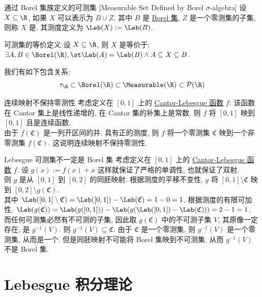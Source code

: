 \begin{dfn}
    {通过 Borel 集族定义的可测集}
    [Measurable Set Defined by Borel \(\sigma\)-algebra]
    设 \(X\subseteq\R\), 如果 \(X\) 可以表示为 \(B\cup Z\), 其中 \(B\) 是 \hyperref[xmp:borel]{Borel 集}, \(Z\) 是一个零测集的子集, 则称 \(X\) 是\MeasurableSet{}. 其测度定义为 \(\Leb(X) := \Leb(B)\).
\end{dfn}
\begin{ppt}
    {可测集的等价定义}
    设 \(X\subseteq\R\), 则 \(X\) 是\MeasurableSet{}等价于: \(\exists A,B\in\Borel(\R), \st \Leb(A)=\Leb(B) \land A\subseteq X\subseteq B\).
\end{ppt}
\begin{rmk}
    我们有如下包含关系:
    \[\tau_{\R}\subset\Borel(\R)\subset\Measurable(\R)\subset\mathcal{P}(\R)\]
\end{rmk}
\begin{cxmp}
    {连续映射不保持零测性}
    考虑定义在 \([0,1]\) 上的 \hyperref[dfn:cantor-lebesgue-function]{Cantor-Lebesgue 函数} \(f\): 该函数在 Cantor 集上是线性递增的, 在 Cantor 集的补集上是常数. 则 \(f\) 将 \([0,1]\) 映到 \([0,1]\) 且是连续函数. \\
    由于 \(f(\mathfrak{C})\) 是一列开区间的并, 具有正的测度, 则 \(f\) 将一个零测集 \(\mathfrak{C}\) 映到一个非零测集 \(f(\mathfrak{C})\). 这说明连续映射不保持零测性.
\end{cxmp}
\begin{cxmp}
    {Lebesgue 可测集不一定是 Borel 集}
    考虑定义在 \([0,1]\) 上的 \hyperref[dfn:cantor-lebesgue-function]{Cantor-Lebesgue 函数} \(f\). 设 \(g(x):=f(x)+x\) 这样就保证了严格的单调性, 也就保证了双射.\\
    则 \(g\) 是从 \([0,1]\) 到 \([0,2]\) 的同胚映射. 根据测度的平移不变性, \(g\) 将 \([0,1]\setminus\mathfrak{C}\) 映到 \([0,2]\setminus g(\mathfrak{C})\).\\
    其中 \(\Leb([0,1]\setminus\mathfrak{C})=\Leb([0,1])-\Leb(\mathfrak{C})=1-0=1\). 根据测度的有限可加性, \(\Leb(g(\mathfrak{C}))=\Leb(g([0,1]))-\Leb(g(\Leb([0,1])-\Leb(\mathfrak{C})))=2-1=1\).\\
    而任何可测集必然有不可测的子集, 因此取 \(g(\mathfrak{C})\) 中的不可测子集 \(V\), 其原像一定存在, 是 \(g^{-1}(V)\). 则 \(g^{-1}(V)\subseteq\mathfrak{C}\). 由于 \(\mathfrak{C}\) 是一个零测集, 则 \(g^{-1}(V)\) 是一个零测集, 从而是一个\MeasurableSet{}. 但是同胚映射不可能将 Borel 集映到不可测集. 从而 \(g^{-1}(V)\) 不是 Borel 集.
\end{cxmp}
\section{Lebesgue 积分理论}
